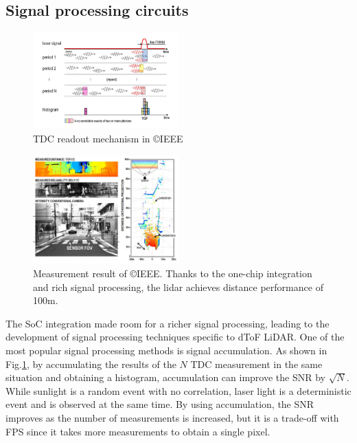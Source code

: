 \documentclass[paper]{ieice}
\begin{document}
\subsection{Signal processing circuits}
\begin{figure}[!t]
\centering
 \includegraphics[width=0.5\textwidth]{figs/threshold.png}
  \caption{TDC readout mechanism in \cite{niclass20130} \copyright IEEE}
\label{tdc}
\end{figure}


\begin{figure}[!t]
\centering
 \includegraphics[width=0.5\textwidth]{figs/distance_image.png}
  \caption{Measurement result of \cite{niclass20130} \copyright IEEE. Thanks to the one-chip integration and rich signal processing, the lidar achieves distance performance of 100m.}
\label{meas}
\end{figure}

\qquad The SoC integration made room for a richer signal processing, leading to the development of signal processing techniques specific to dToF LiDAR. One of the most popular signal processing methods is signal accumulation. As shown in Fig.\ref{tdc}, by accumulating the results of the $N$ TDC measurement in the same situation and obtaining a histogram, accumulation can improve the SNR by $\sqrt{N}$. While sunlight is a random event with no correlation, laser light is a deterministic event and is observed at the same time. By using accumulation, the SNR improves as the number of measurements is increased, but it is a trade-off with FPS since it takes more measurements to obtain a single pixel.
\end{document}
